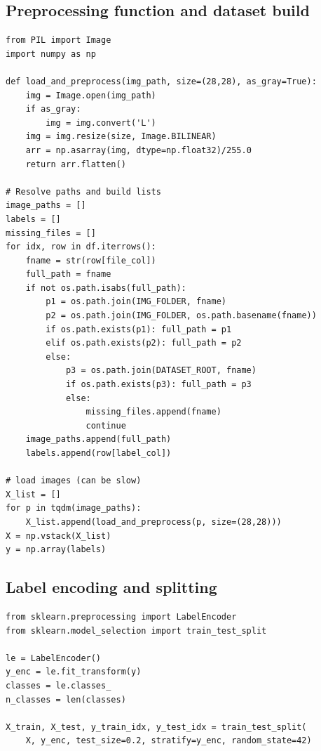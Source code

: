 \documentclass[11pt,a4paper]{article}
\begin{document}
\subsection{Preprocessing function and dataset build}
\begin{lstlisting}[caption={Image preprocessing and building X,y arrays}]
from PIL import Image
import numpy as np

def load_and_preprocess(img_path, size=(28,28), as_gray=True):
    img = Image.open(img_path)
    if as_gray:
        img = img.convert('L')
    img = img.resize(size, Image.BILINEAR)
    arr = np.asarray(img, dtype=np.float32)/255.0
    return arr.flatten()

# Resolve paths and build lists
image_paths = []
labels = []
missing_files = []
for idx, row in df.iterrows():
    fname = str(row[file_col])
    full_path = fname
    if not os.path.isabs(full_path):
        p1 = os.path.join(IMG_FOLDER, fname)
        p2 = os.path.join(IMG_FOLDER, os.path.basename(fname))
        if os.path.exists(p1): full_path = p1
        elif os.path.exists(p2): full_path = p2
        else:
            p3 = os.path.join(DATASET_ROOT, fname)
            if os.path.exists(p3): full_path = p3
            else:
                missing_files.append(fname)
                continue
    image_paths.append(full_path)
    labels.append(row[label_col])

# load images (can be slow)
X_list = []
for p in tqdm(image_paths):
    X_list.append(load_and_preprocess(p, size=(28,28)))
X = np.vstack(X_list)
y = np.array(labels)
\end{lstlisting}

\subsection{Label encoding and splitting}
\begin{lstlisting}[caption={Label encoding and train/test split}]
from sklearn.preprocessing import LabelEncoder
from sklearn.model_selection import train_test_split

le = LabelEncoder()
y_enc = le.fit_transform(y)
classes = le.classes_
n_classes = len(classes)

X_train, X_test, y_train_idx, y_test_idx = train_test_split(
    X, y_enc, test_size=0.2, stratify=y_enc, random_state=42)
\end{lstlisting}
\end{document}
